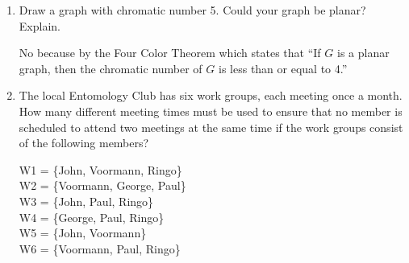 \documentclass[11pt, letterpaper, includehead]{article}
\theoremstyle{plain}
\theoremstyle{mydefinition}
\theoremstyle{myproperty}
\begin{document}
\begin{enumerate}[label=\textbf{\arabic*}., leftmargin=*]
    \item Draw a graph with chromatic number 5. Could your graph be planar? Explain.
    
    No because by the Four Color Theorem which states that ``If $G$ is a planar graph, then the chromatic number of $G$ is less than or equal to 4.'' 

    \begin{center}
    \end{center}


    \item The local Entomology Club has six work groups, each meeting once a month. How many different meeting times must be used to ensure that no member is scheduled to attend two meetings at the same time if the work groups consist of the following members?
    
    W1 = \{John, Voormann, Ringo\}\\
    W2 = \{Voormann, George, Paul\}\\
    W3 = \{John, Paul, Ringo\}\\
    W4 = \{George, Paul, Ringo\}\\
    W5 = \{John, Voormann\}\\
    W6 = \{Voormann, Paul, Ringo\}\\
\end{enumerate}
\end{document}
